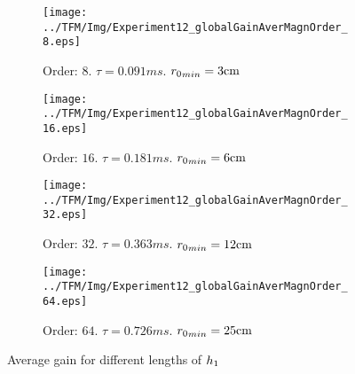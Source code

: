\begin{figure}[h]
	\centering
	\begin{subfigure}[b]{0.45\textwidth}
		\centering
		\texttt{[image: ../TFM/Img/Experiment12\_globalGainAverMagnOrder\_8.eps]}
		\caption{Order: $8$. $\tau = 0.091 \si{ms}$. ${\distLinePrimSource}_{min} = 3\si{cm}$}
	\end{subfigure}
	\begin{subfigure}[b]{0.45\textwidth}
		\centering
		\texttt{[image: ../TFM/Img/Experiment12\_globalGainAverMagnOrder\_16.eps]}
		\caption{Order: $16$. $\tau = 0.181 \si{ms}$. ${\distLinePrimSource}_{min} = 6\si{cm}$}
	\end{subfigure}
	\begin{subfigure}[b]{0.45\textwidth}
		\centering
		\texttt{[image: ../TFM/Img/Experiment12\_globalGainAverMagnOrder\_32.eps]}
		\caption{Order: $32$. $\tau = 0.363 \si{ms}$. ${\distLinePrimSource}_{min} = 12\si{cm}$}
	\end{subfigure}
	\begin{subfigure}[b]{0.45\textwidth}
		\centering
		\texttt{[image: ../TFM/Img/Experiment12\_globalGainAverMagnOrder\_64.eps]}
		\caption{Order: $64$. $\tau = 0.726 \si{ms}$. ${\distLinePrimSource}_{min} = 25\si{cm}$}
	\end{subfigure}
	
	\caption{Average gain for different lengths of $\freqFilter[time][magnitude]$}
	\label{gainAverDifMagFilterLength}
\end{figure}


